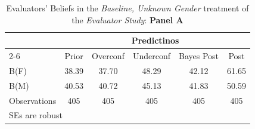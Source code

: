 \begin{table}[htbp]\centering
\caption{Evaluators' Beliefs in the \textit{Baseline, Unknown Gender} treatment of the \textit{Evaluator Study}: \textbf{Panel A}}
\begin{tabular}{l*{5}{c}}
\hline\hline
                &\multicolumn{5}{c}{Predictinos}                  \\\cmidrule(lr){2-6}
                &\multicolumn{1}{c}{Prior}&\multicolumn{1}{c}{Overconf}&\multicolumn{1}{c}{Underconf}&\multicolumn{1}{c}{Bayes Post}&\multicolumn{1}{c}{Post}\\
\hline
B(F)            &    38.39&    37.70&    48.29&    42.12&    61.65\\
B(M)            &    40.53&    40.72&    45.13&    41.83&    50.59\\
\hline
Observations    &      405&      405&      405&      405&      405\\
\hline\hline
\multicolumn{6}{l}{\footnotesize SEs are robust}\\
\end{tabular}
\end{table}
